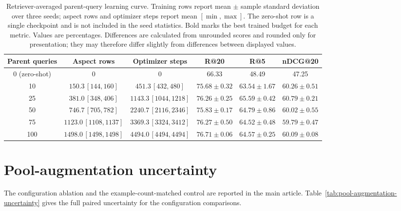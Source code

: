 \documentclass[pdflatex,sn-basic,Numbered]{sn-jnl}%
\theoremstyle{thmstyleone}%
\theoremstyle{thmstyletwo}%
\theoremstyle{thmstylethree}%
\begin{document}
\begin{table}[ht]


\centering
\scriptsize
\setlength{\tabcolsep}{4.2pt}
\renewcommand{\arraystretch}{1.08}
\begin{adjustbox}{max width=\linewidth}
\begin{tabular}{c c c c c c}
\hline
Parent queries & Aspect rows & Optimizer steps & R@20 & R@5 & nDCG@20 \\
\hline
0 (zero-shot) & 0 & 0 & 66.33 & 48.49 & 47.25 \\
10  & $150.3\,[144,160]$   & $451.3\,[432,480]$   & $75.68\pm0.32$ & $63.54\pm1.67$ & $60.26\pm0.51$ \\
25  & $381.0\,[348,406]$   & $1143.3\,[1044,1218]$ & $76.26\pm0.25$ & $\mathbf{65.59\pm0.42}$ & $\mathbf{60.79\pm0.21}$ \\
50  & $746.7\,[705,782]$   & $2240.7\,[2116,2346]$ & $75.83\pm0.17$ & $64.79\pm0.86$ & $60.02\pm0.55$ \\
75  & $1123.0\,[1108,1137]$ & $3369.3\,[3324,3412]$ & $76.27\pm0.50$ & $64.52\pm0.48$ & $59.79\pm0.47$ \\
100 & $1498.0\,[1498,1498]$ & $4494.0\,[4494,4494]$ & $\mathbf{76.71\pm0.06}$ & $64.57\pm0.25$ & $60.09\pm0.08$ \\
\hline
\end{tabular}
\end{adjustbox}


\caption{Retriever-averaged parent-query learning curve. Training rows report
mean $\pm$ sample standard deviation over three seeds; aspect rows and optimizer
steps report mean $[\min,\max]$. The zero-shot row is a single checkpoint and is
not included in the seed statistics. Bold marks the best trained budget for each
metric. Values are percentages. Differences are calculated from unrounded
scores and rounded only for presentation; they may therefore differ slightly
from differences between displayed values.}
\label{tab:parent-budget-main}
\end{table}

\FloatBarrier
\section{Pool-augmentation uncertainty}
\label{supp:augmentation}

The configuration ablation and the example-count-matched control are reported in the main article. Table~\ref{tab:pool-augmentation-uncertainty} gives the full paired uncertainty for the configuration comparisons.
\end{document}
